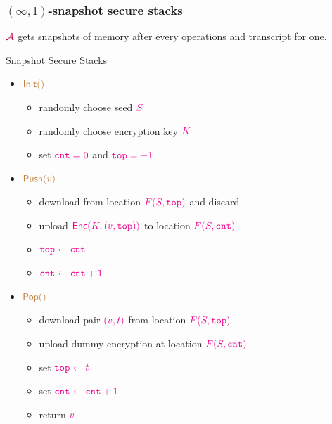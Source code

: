 \documentclass[]{beamer}
\newcommand{\calA}{\mathcal{A}}
\newcommand{\cnt}{\mathtt{cnt}}
\newcommand{\tpp}{\mathtt{top}}
\newcommand{\init}{\mathsf{Init}}
\newcommand{\push}{\mathsf{Push}}
\newcommand{\pop}{\mathsf{Pop}}
\newcommand{\enc}{\mathsf{Enc}}
\begin{document}
\begin{frame}
\frametitle{$(\infty,1)$-snapshot secure stacks}

$\color{purple}\calA$ gets snapshots of memory after 
{\color{teal} every operations} and transcript for {\color{teal} one}.

\pause


\begin{block}{Snapshot Secure Stacks}
\begin{itemize}
\color{blue}
    \item $\color{brown}\init()$
    \begin{itemize}
        \item randomly choose seed $\color{magenta}S$
        \item randomly choose encryption key $\color{magenta}K$
        \item set $\color{magenta}\cnt=0$ and $\color{magenta}\tpp=-1$. 
    \end{itemize}
    \item $\color{brown}\push(v)$
    \begin{itemize}
        \item download from location $\color{magenta}F(S,\tpp)$ and discard 
        \item upload $\color{magenta}\enc(K,(v,\tpp))$ to location $\color{magenta}F(S,\cnt)$
        \item $\color{magenta}\tpp\leftarrow\cnt$
        \item $\color{magenta}\cnt\leftarrow\cnt+1$
    \end{itemize}
    \item $\color{brown}\pop()$
    \begin{itemize}
        \item download pair $\color{magenta} (v,t)$
            from location $\color{magenta}F(S,\tpp)$
        \item upload dummy encryption at location 
            $\color{magenta}F(S,\cnt)$
        \item set $\color{magenta} \tpp\leftarrow t$ 
        \item set $\color{magenta}\cnt\leftarrow\cnt+1$
        \item return $\color{magenta} v$
  \end{itemize}
\end{itemize}
\end{block}
\end{frame}
    
\end{document}
